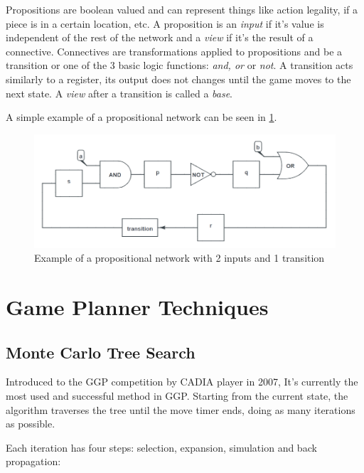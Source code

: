 Propositions are boolean valued and can represent things like action legality, if a piece is in a certain location, etc. A proposition is an \textit{input} if it's value is independent of the rest of the network and a \textit{view} if it's the result of a connective.
Connectives are transformations applied to propositions and be a transition or one of the 3 basic logic functions: \textit{and, or} or \textit{not}. A transition acts similarly to a register, its output does not changes until the game moves to the next state. A \textit{view} after a transition is called a \textit{base}.

A simple example of a propositional network can be seen in \ref{fig:propnets example}.

\begin{figure}[h]
	\centering
    \includegraphics[scale=0.45]{images/propnets_example.png}
    \caption{Example of a propositional network with 2 inputs and 1 transition}
    \label{fig:propnets example}
\end{figure}


\section{Game Planner Techniques}
\subsection{Monte Carlo Tree Search}
Introduced to the GGP competition by CADIA player in 2007, It’s currently the most used and successful method in GGP. Starting from the current state, the algorithm traverses the tree until the move timer ends, doing as many iterations as possible.

Each iteration has four steps: selection, expansion, simulation and back propagation:


